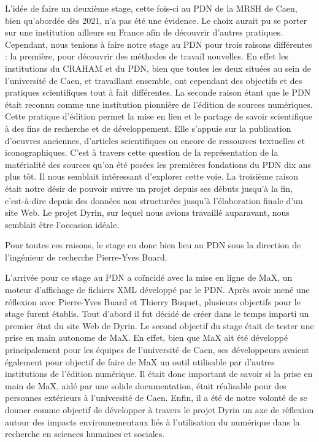 \documentclass[a4paper,12pt,twoside]{book}
\begin{document}
L'idée de faire un deuxième stage, cette fois-ci au \acrlong{PDN} de la \acrlong{MRSH} de Caen, bien qu'abordée dès 2021, n'a pas été une évidence. Le choix aurait pu se porter sur une institution ailleurs en France afin de découvrir d'autres pratiques. Cependant, nous tenions à faire notre stage au \acrshort{PDN} pour trois raisons différentes : la première, pour découvrir des méthodes de travail nouvelles. En effet les institutions du \acrshort{CRAHAM} et du \acrshort{PDN}, bien que toutes les deux situées au sein de l'université de Caen, et travaillant ensemble, ont cependant des objectifs et des pratiques scientifiques tout à fait différentes. La seconde raison étant que le \acrshort{PDN} était reconnu comme une institution pionnière de l'édition de sources numériques. Cette pratique d'édition permet la mise en lien et le partage de savoir scientifique à des fins de recherche et de développement. Elle s'appuie sur la publication d'oeuvres anciennes, d'articles scientifiques ou encore de ressources textuelles et iconographiques. C'est à travers cette question de la représentation de la matérialité des sources qu'on été posées les premières fondations du \acrshort{PDN} dix ans plus tôt. Il nous semblait intéressant d'explorer cette voie. La troisième raison était notre désir de pouvoir suivre un projet depuis ses débuts jusqu'à la fin, c'est-à-dire depuis des données non structurées jusqu'à l'élaboration finale d'un site Web. Le projet Dyrin, sur lequel nous avions travaillé auparavant, nous semblait être l'occasion idéale.

Pour toutes ces raisons, le stage eu donc bien lieu au \acrshort{PDN} sous la direction de l'ingénieur de recherche Pierre-Yves Buard.

L'arrivée pour ce stage au \acrshort{PDN} a coïncidé avec la mise en ligne de MaX, un moteur d'affichage de fichiers XML développé par le \acrshort{PDN}. Après avoir mené une réflexion avec Pierre-Yves Buard et Thierry Buquet, plusieurs objectifs pour le stage furent établis.
Tout d'abord il fut décidé de créer dans le temps imparti un premier état du site Web de Dyrin. Le second objectif du stage était de tester une prise en main autonome de MaX. En effet, bien que MaX ait été développé principalement pour les équipes de l'université de Caen, ses développeurs avaient également pour objectif de faire de MaX un outil utilisable par d'autres institutions de l'édition numérique. Il était donc important de savoir si la prise en main de MaX, aidé par une solide documentation, était réalisable pour des personnes extérieurs à l'université de Caen. Enfin, il a été de notre volonté de se donner comme objectif de développer à travers le projet Dyrin un axe de réflexion autour des impacts environnementaux liés à l'utilisation du numérique dans la recherche en sciences humaines et sociales.
\end{document}
